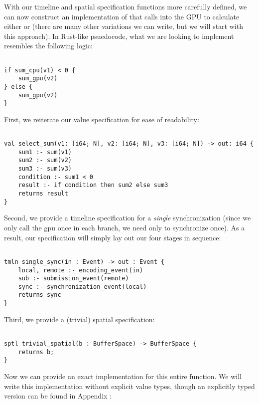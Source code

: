 With our timeline and spatial specification functions more carefully defined, we can now construct an implementation of  that calls into the GPU to calculate either  or  (there are many other variations we can write, but we will start with this approach).  In Rust-like psuedocode, what we are looking to implement resembles the following logic:
%
\begin{lstlisting}

if sum_cpu(v1) < 0 {
    sum_gpu(v2)
} else {
    sum_gpu(v2)
}
\end{lstlisting}
%
First, we reiterate our value specification for ease of readability:
%
\begin{lstlisting}

val select_sum(v1: [i64; N], v2: [i64; N], v3: [i64; N]) -> out: i64 {
    sum1 :- sum(v1)
    sum2 :- sum(v2)
    sum3 :- sum(v3)
    condition :- sum1 < 0
    result :- if condition then sum2 else sum3
    returns result
}
\end{lstlisting}
%
Second, we provide a timeline specification for a \emph{single} synchronization (since we only call the gpu once in each branch, we need only to synchronize once).  As a result, our specification will simply lay out our four stages in sequence:
%
\begin{lstlisting}

tmln single_sync(in : Event) -> out : Event {
    local, remote :- encoding_event(in)
    sub :- submission_event(remote)
    sync :- synchronization_event(local)
    returns sync
}
\end{lstlisting}
%
Third, we provide a (trivial) spatial specification:
%
\begin{lstlisting}

sptl trivial_spatial(b : BufferSpace) -> BufferSpace {
    returns b;
}
\end{lstlisting}
%
Now we can provide an exact implementation for this entire function.  We will write this implementation without explicit value types, though an explicitly typed version can be found in Appendix :
%
